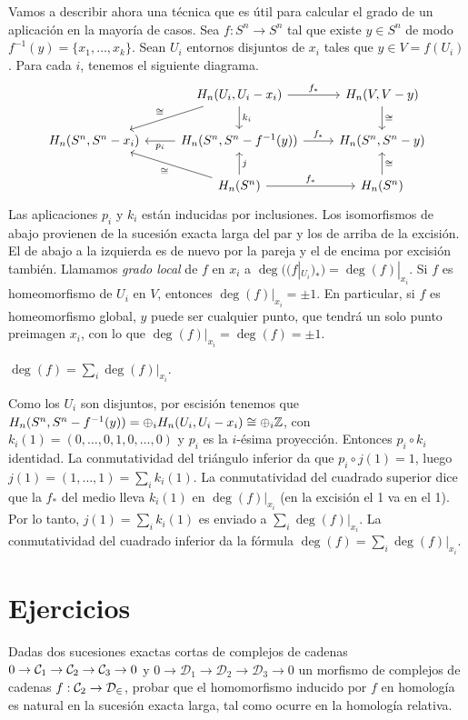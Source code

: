 \documentclass[TA.tex]{subfiles}
\begin{document}
Vamos a describir ahora una técnica que es útil para calcular el grado de un aplicación en la mayoría de casos. Sea $f:S^n\to S^n$ tal que existe $y\in S^n$ de modo $f^{-1}(y)=\{x_1,\dots, x_k\}$. Sean $U_i$ entornos disjuntos de $x_i$ tales que $y\in V=f(U_i)$. Para cada $i$, tenemos el siguiente diagrama. 
\[
\begin{tikzcd}
& H_n(U_i, U_i-x_i)\arrow[dl, "\cong"']\arrow[r, "f_*"]\arrow[d, "k_i"] & H_n(V, V-y)\arrow[d, "\cong"]\\
H_n(S^n, S^n-x_i) & H_n(S^n, S^n-f^{-1}(y))\arrow[l, "p_i"]\arrow[r, "f_*"] & H_n(S^n, S^n-y) \\
& H_n(S^n)\arrow[ul, "\cong"]\arrow[u, "j"']\arrow[r, "f_*"] & H_n(S^n)\arrow[u, "\cong"']
\end{tikzcd}
\]
Las aplicaciones $p_i$ y $k_i$ están inducidas por inclusiones. Los isomorfismos de abajo provienen de la sucesión exacta larga del par y los de arriba de la excisión. El de abajo a la izquierda es de nuevo por la pareja y el de encima por excisión también. Llamamos \emph{grado local} de $f$ en $x_i$ a $\deg((f|_{U_i})_*)=\deg(f)|_{x_i}$. Si $f$ es homeomorfismo de $U_i$ en $V$, entonces $\deg(f)|_{x_i}=\pm 1$. En particular, si $f$ es homeomorfismo global, $y$ puede ser cualquier punto, que tendrá un solo punto preimagen $x_i$, con lo que $\deg(f)|_{x_i}=\deg(f)=\pm 1$.

\begin{prop}
$\deg(f)=\sum_i \deg(f)|_{x_i}$. 
\end{prop}
\begin{dem}
Como los $U_i$ son disjuntos, por escisión tenemos que $H_n(S^n, S^n-f^{-1}(y))=\oplus_i H_n(U_i, U_i-x_i)\cong\oplus_i\mathbb{Z}$, con $k_i(1)=(0,\dots,0, 1,0,\dots, 0)$ y $p_i$ es la $i$-ésima proyección. Entonces $p_i\circ k_i$ identidad. La conmutatividad del triángulo inferior da que $p_i\circ j(1)=1$, luego $j(1)=(1,\dots, 1)=\sum_ik_i(1)$. La conmutatividad del cuadrado superior dice que la $f_*$ del medio lleva $k_i(1)$ en $\deg(f)|_{x_i}$ (en la excisión el 1 va en el 1). Por lo tanto, $j(1)=\sum_ik_i(1)$ es enviado a $\sum_i \deg(f)|_{x_i}$. La conmutatividad del cuadrado inferior da la fórmula $\deg(f)=\sum_i \deg(f)|_{x_i}$.
\end{dem}
\section{Ejercicios}
\begin{ejer}
Dadas dos sucesiones exactas cortas de complejos de cadenas $0\to \mathcal{C}_1\to \mathcal{C}_2\to\mathcal{C}_3\to 0$ y $0\to \mathcal{D}_1\to \mathcal{D}_2\to\mathcal{D}_3\to 0$ un morfismo de complejos de cadenas $f:\mathcal{C}_2\to\mathcal{D_2}$, probar que el homomorfismo inducido por $f$ en homología es natural en la sucesión exacta larga, tal como ocurre en la homología relativa. 
\end{ejer}
\end{document}
